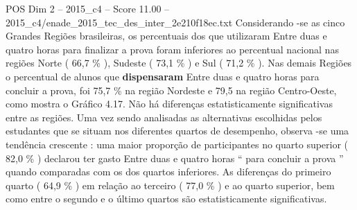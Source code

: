 \begin{textsample}{POS Dim 2 – 2015\_c4 – Score 11.00 – 2015\_c4/enade\_2015\_tec\_des\_inter\_2e210f18ec.txt}
Considerando -se as cinco Grandes Regiões brasileiras, os percentuais dos que utilizaram Entre duas e quatro horas para finalizar a prova foram inferiores ao percentual nacional nas regiões Norte ( 66,7 \% ), Sudeste ( 73,1 \% ) e Sul ( 71,2 \% ).
Nas demais Regiões o percentual de alunos que \textbf{dispensaram} Entre duas e quatro horas para concluir a prova, foi 75,7 \% na região Nordeste e 79,5 na região Centro-Oeste, como mostra o Gráfico 4.17.
Não há diferenças estatisticamente significativas entre as regiões.
Uma vez sendo analisadas as alternativas escolhidas pelos estudantes que se situam nos diferentes quartos de desempenho, observa -se uma tendência crescente : uma maior proporção de participantes no quarto superior ( 82,0 \% ) declarou ter gasto Entre duas e quatro horas “ para concluir a prova ” quando comparadas com os dos quartos inferiores.
As diferenças do primeiro quarto ( 64,9 \% ) em relação ao terceiro ( 77,0 \% ) e ao quarto superior, bem como entre o segundo e o último quartos são estatisticamente significativas.

\end{textsample}
